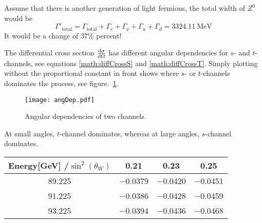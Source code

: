 Assume that there is another generation of light fermions, the total width of $Z^0$ would be
\begin{equation}
	\Gamma'_\text{total} = \Gamma_\text{total} + \Gamma_e + \Gamma_\nu + \Gamma_u + \Gamma_d = \SI{3324.11}{\mega\eV}
\end{equation}
It would be a change of $37 \%$ percent!

The differential cross section $\dv{\sigma}{\Omega}$ has different angular dependencies for $s$- and $t$-channels, see equations \eqref{math:diffCrossS} and \eqref{math:diffCrossT}. Simply plotting without the proportional constant in front shows where $s$- or $t$-channels dominates the process, see figure.~\ref{fig:angDep}.
\begin{figure}[ht]
	\centering
	\texttt{[image: angDep.pdf]}
	\caption{Angular dependencies of two channels.}%
	\label{fig:angDep}
\end{figure}
At small angles, $t$-channel dominates, whereas at large angles, $s$-channel dominates.

\begin{tabular}{c|ccc}
	\toprule
	Energy[\si{\giga\eV}] /$\sin^2(\theta_W)$ & \num{0.21} & \num{0.23} & \num{0.25} \\
	\midrule
	\num{89.225} & \num{-0.0379} & \num{-0.0420} & \num{-0.0451} \\
	\num{91.225} & \num{-0.0386} & \num{-0.0428} & \num{-0.0459} \\
	\num{93.225} & \num{-0.0394} & \num{-0.0436} & \num{-0.0468} \\
	\bottomrule
\end{tabular}
